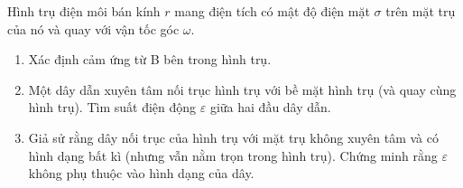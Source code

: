     
 \begin{vd}
    Hình trụ điện môi bán kính $r$ mang điện tích có mật độ điện mặt $\sigma$ trên mặt trụ của nó và quay với vận tốc góc $\omega$.
    \begin{enumerate}[1)]
        \item Xác định cảm ứng từ B bên trong hình trụ.
        \item Một dây dẫn xuyên tâm nối trục hình trụ với bề mặt hình trụ (và quay cùng hình trụ). Tìm suất điện động $\varepsilon$ giữa hai đầu dây dẫn.
        \item Giả sử rằng dây nối trục của hình trụ với mặt trụ không xuyên tâm và có hình dạng bất kì (nhưng vẫn nằm trọn trong hình trụ). Chứng minh rằng $\varepsilon$ không phụ thuộc vào hình dạng của dây.
    \end{enumerate}
\end{vd}
